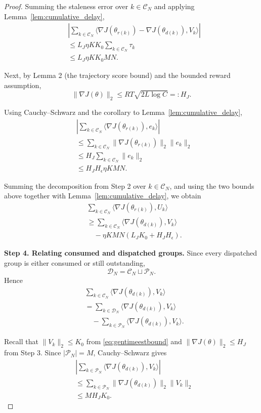 \begin{proof}
Summing the staleness error over $k\in\mathcal C_N$
and applying Lemma~\ref{lem:cumulative_delay},
\begin{align*}
&\left|
\sum_{k\in\mathcal C_N}
\langle
\nabla J(\theta_{r(k)})-\nabla J(\theta_{d(k)}),
V_k\rangle
\right|\\
&\le L_J\eta KK_0
\sum_{k\in\mathcal C_N}\tau_k\\
&\le L_J\eta KK_0MN.
\end{align*}


Next, by Lemma 2 (the trajectory score bound)
and the bounded reward assumption,
\[
\|\nabla J(\theta)\|_2
\le RT\sqrt{2L\log C}
=:H_J.
\]

Using Cauchy--Schwarz and the corollary to
Lemma~\ref{lem:cumulative_delay},
\begin{align*}
&\left|
\sum_{k\in\mathcal C_N}
\langle\nabla J(\theta_{r(k)}),e_k\rangle
\right|\\
&\le
\sum_{k\in\mathcal C_N}
\|\nabla J(\theta_{r(k)})\|_2\|e_k\|_2\\
&\le H_J\sum_{k\in\mathcal C_N}\|e_k\|_2\\
&\le H_JH_\epsilon\eta KMN.
\end{align*}

Summing the decomposition from Step 2 over
$k\in\mathcal C_N$, and using the two bounds above
together with Lemma~\ref{lem:cumulative_delay},
we obtain
\begin{align}
&\sum_{k\in\mathcal C_N}
\langle\nabla J(\theta_{r(k)}),U_k\rangle
\nonumber\\
&\ge
\sum_{k\in\mathcal C_N}
\langle\nabla J(\theta_{d(k)}),V_k\rangle
\nonumber\\
&\quad-\eta KMN(L_JK_0+H_JH_\epsilon).
\label{eq:async_error_bound}
\end{align}

\textbf{Step 4. Relating consumed and dispatched groups.}
Since every dispatched group is either consumed or
still outstanding,
\[
\mathcal D_N=\mathcal C_N\sqcup\mathcal P_N.
\]
Hence
\begin{align*}
&\sum_{k\in\mathcal C_N}
\langle\nabla J(\theta_{d(k)}),V_k\rangle\\
&=
\sum_{k\in\mathcal D_N}
\langle\nabla J(\theta_{d(k)}),V_k\rangle\\
&\quad-
\sum_{k\in\mathcal P_N}
\langle\nabla J(\theta_{d(k)}),V_k\rangle.
\end{align*}

Recall that $\|V_k\|_2\le K_0$ from \eqref{eq:gentimeestbound} and
$\|\nabla J(\theta)\|_2\le H_J$ from Step 3.
Since $|\mathcal P_N|=M$, Cauchy--Schwarz gives
\begin{align*}
&\left|
\sum_{k\in\mathcal P_N}
\langle\nabla J(\theta_{d(k)}),V_k\rangle
\right|\\
&\le
\sum_{k\in\mathcal P_N}
\|\nabla J(\theta_{d(k)})\|_2\|V_k\|_2\\
&\le MH_JK_0.
\end{align*}


\end{proof}
